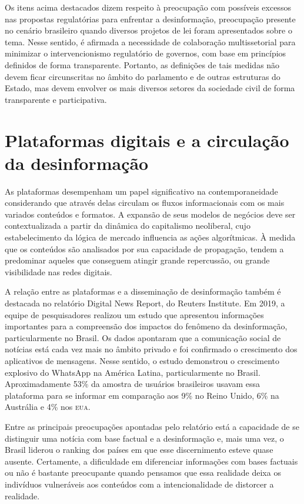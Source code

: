 Os itens acima destacados dizem respeito à preocupação com possíveis
excessos nas propostas regulatórias para enfrentar a desinformação,
preocupação presente no cenário brasileiro quando diversos projetos de
lei foram apresentados sobre o tema. Nesse sentido, é afirmada a
necessidade de colaboração multissetorial para minimizar o
intervencionismo regulatório de governos, com base em princípios
definidos de forma transparente. Portanto, as definições de tais medidas
não devem ficar circunscritas no âmbito do parlamento e de outras
estruturas do Estado, mas devem envolver os mais diversos setores da
sociedade civil de forma transparente e participativa.

\section{Plataformas digitais e a circulação da desinformação}

As plataformas desempenham um papel significativo na contemporaneidade
considerando que através delas circulam os fluxos informacionais com os
mais variados conteúdos e formatos. A expansão de seus modelos de
negócios deve ser contextualizada a partir da dinâmica do capitalismo
neoliberal, cujo estabelecimento da lógica de mercado influencia as
ações algorítmicas. À medida que os conteúdos são analisados por sua
capacidade de propagação, tendem a predominar aqueles que conseguem 
atingir grande repercussão, ou grande visibilidade nas redes digitais.

A relação entre as plataformas e a disseminação de desinformação também
é destacada no relatório Digital News Report, do Reuters Institute. Em 2019, a
equipe de pesquisadores realizou um estudo que apresentou informações
importantes para a compreensão dos impactos do fenômeno da
desinformação, particularmente no Brasil. Os dados apontaram que a
comunicação social de notícias está cada vez mais no âmbito privado e
foi confirmado o crescimento dos aplicativos de mensagens. Nesse
sentido, o estudo demonstrou o crescimento explosivo do WhatsApp na
América Latina, particularmente no Brasil. Aproximadamente 53\% da
amostra de usuários brasileiros usavam essa plataforma para se informar
em comparação aos 9\% no Reino Unido, 6\% na Austrália e 4\% nos \textsc{eua}.

Entre as principais preocupações apontadas pelo relatório está a
capacidade de se distinguir uma notícia com base factual e a
desinformação e, mais uma vez, o Brasil liderou o ranking dos países em
que esse discernimento esteve quase ausente. Certamente, a dificuldade
em diferenciar informações com bases factuais ou não é bastante
preocupante quando pensamos que essa realidade deixa os indivíduos
vulneráveis aos conteúdos com a intencionalidade de distorcer a
realidade.


